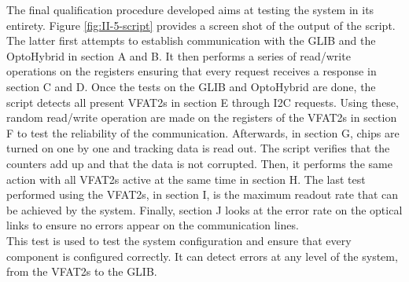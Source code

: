     The final qualification procedure developed aims at testing the system in its entirety. Figure \ref{fig:II-5-script} provides a screen shot of the output of the script. The latter first attempts to establish communication with the GLIB and the OptoHybrid in section A and B. It then performs a series of read/write operations on the registers ensuring that every request receives a response in section C and D. Once the tests on the GLIB and OptoHybrid are done, the script detects all present VFAT2s in section E through I2C requests. Using these, random read/write operation are made on the registers of the VFAT2s in section F to test the reliability of the communication. Afterwards, in section G, chips are turned on one by one and tracking data is read out. The script verifies that the counters add up and that the data is not corrupted. Then, it performs the same action with all VFAT2s active at the same time in section H. The last test performed using the VFAT2s, in section I, is the maximum readout rate that can be achieved by the system. Finally, section J looks at the error rate on the optical links to ensure no errors appear on the communication lines. \\

    This test is used to test the system configuration and ensure that every component is configured correctly. It can detect errors at any level of the system, from the VFAT2s to the GLIB.

